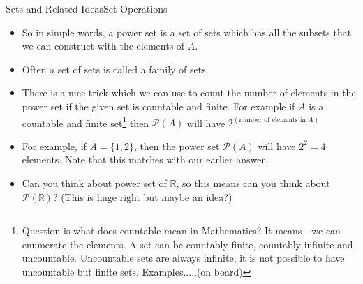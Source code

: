 \documentclass[8pt,usepdftitle=false]{beamer}
\begin{document}
\begin{frame}[allowframebreaks]{Sets and Related Ideas}{Set Operations}
\begin{itemize}
\begin{itemize}
  \begin{align*}
    \mathcal{P}(A) &= \Big\{ \{\}, \{1\}, \{2\}, \{1, 2\}, \{4\}, \{1, 4\}, \{2, 4\}, \{1, 2, 4\} \Big\} \\
    &= \Big\{ \emptyset, \{1\}, \{2\}, \{1, 2\}, \{4\}, \{1, 4\}, \{2, 4\}, A\Big\}
  \end{align*}

  \item If we have a set  $B = \{a, b, c, d\}$, calculate $\mathcal{P}(B)$

  \item If we have a set $\Omega = \{H, T\}$, calculate $\mathcal{P}(\Omega)$

   \item If we have a set $\Omega = \{1, 2, 3, 4, 5, 6\}$, calculate $\mathcal{P}(\Omega)$
\end{itemize}


\item So in simple words, a \alert{power set is a set of sets} which has all the subsets that we can construct with the elements of $A$.

\item Often a \alert{set of sets} is called a \alert{family of sets}.


  \item There is a nice trick which we can use to count the number of elements in the power set if the given set is countable and finite. For example if $A$ is a \alert{countable and finite set}\footnote[frame]{Question is what does countable mean in Mathematics? It means - we can \alert{enumerate} the elements. A set can be countably finite, countably infinite and uncountable. Uncountable sets are always infinite, it is not possible to have uncountable but finite sets. Examples.....(on board)} then $\mathcal{P}(A)$ will have $    2^{(\text{number of elements in } A)}$








\item For example, if $A = \{1, 2\}$, then the power set $\mathcal{P}(A)$ will have $2^2 = 4$ elements. Note that this matches with our earlier answer. 


\item Can you think about power set of $\mathbb{R}$, so this means can you think about $\mathcal{P}(\mathbb{R})$? (This is huge right but maybe an idea?)



\end{itemize}


\end{frame}
\end{document}
